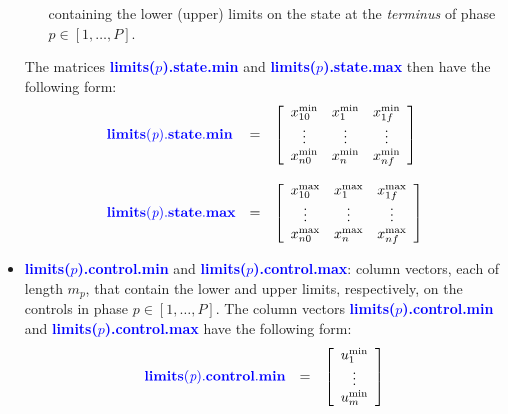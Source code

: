 \documentclass[10pt,final]{report}
\newcommand{\bfblue}[1]{\textcolor{blue}{\bf #1}}
\begin{document}
\begin{itemize}
\begin{itemize}
        containing the lower (upper) limits on the state at the {\em
          terminus} of phase $p\in[1,\ldots,P]$.
      \end{itemize}
      The matrices \bfblue{limits($p$).state.min} and
      \bfblue{limits($p$).state.max} then have the following form:
    \begin{displaymath}
      \begin{array}{lcl}
        \bfblue{limits(\textit{p}).state.min} & = & \left[\begin{array}{ccc} x_{10}^{\textrm{min}}
            & x_{1}^{\textrm{min}} & x_{1f}^{\textrm{min}} \\
            \vdots & \vdots & \vdots \\
            x_{n0}^{\textrm{min}} & x_{n}^{\textrm{min}} & x_{nf}^{\textrm{min}} \\
          \end{array} \right] \\ \\
        \bfblue{limits(\textit{p}).state.max} & = & \left[\begin{array}{ccc} x_{10}^{\textrm{max}}
            & x_{1}^{\textrm{max}} & x_{1f}^{\textrm{max}} \\
            \vdots & \vdots & \vdots \\
            x_{n0}^{\textrm{max}} & x_{n}^{\textrm{max}} & x_{nf}^{\textrm{max}} \\
          \end{array} \right]
      \end{array}
    \end{displaymath}
  \item \bfblue{limits($p$).control.min} and \bfblue{limits($p$).control.max}:  column vectors, each of length
    $m_p$, that contain the lower and upper limits, respectively, on the
    controls in phase $p\in[1,\ldots,P]$.  The column vectors
    \bfblue{limits($p$).control.min} and \bfblue{limits($p$).control.max}
    have the following form:
      \begin{displaymath}
        \begin{array}{lcl}
          \bfblue{limits(\textit{p}).control.min} & = & \left[\begin{array}{c} u_{1}^{\textrm{min}}
              \\ \vdots \\ u_{m}^{\textrm{min}} \end{array} \right] \\ \\

\end{array}
\end{displaymath}
\end{itemize}
\end{document}
